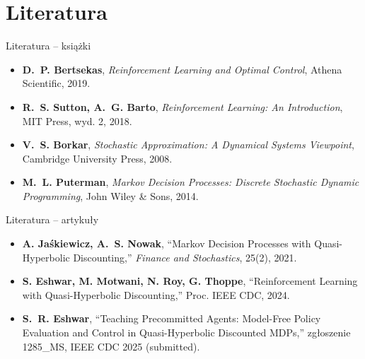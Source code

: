\section{Literatura}

\begin{frame}{Literatura -- książki}
  \small
  \begin{itemize}
    \item \textbf{D.~P. Bertsekas}, \emph{Reinforcement Learning and Optimal Control}, Athena Scientific, 2019.
    \item \textbf{R.~S. Sutton, A.~G. Barto}, \emph{Reinforcement Learning: An Introduction}, MIT Press, wyd. 2, 2018.
    \item \textbf{V.~S. Borkar}, \emph{Stochastic Approximation: A Dynamical Systems Viewpoint}, Cambridge University Press, 2008.
    \item \textbf{M.~L. Puterman}, \emph{Markov Decision Processes: Discrete Stochastic Dynamic Programming}, John Wiley \& Sons, 2014.
  \end{itemize}
\end{frame}

\begin{frame}{Literatura -- artykuły}
  \small
  \begin{itemize}
    \item \textbf{A. Ja{\'s}kiewicz, A.~S. Nowak}, ``Markov Decision Processes with Quasi-Hyperbolic Discounting,'' \emph{Finance and Stochastics}, 25(2), 2021.
    \item \textbf{S. Eshwar, M. Motwani, N. Roy, G. Thoppe}, ``Reinforcement Learning with Quasi-Hyperbolic Discounting,'' Proc. IEEE CDC, 2024.
    \item \textbf{S.~R. Eshwar}, ``Teaching Precommitted Agents: Model-Free Policy Evaluation and Control in Quasi-Hyperbolic Discounted MDPs,'' zgłoszenie 1285\_MS, IEEE CDC 2025 (submitted).
  \end{itemize}
\end{frame}
